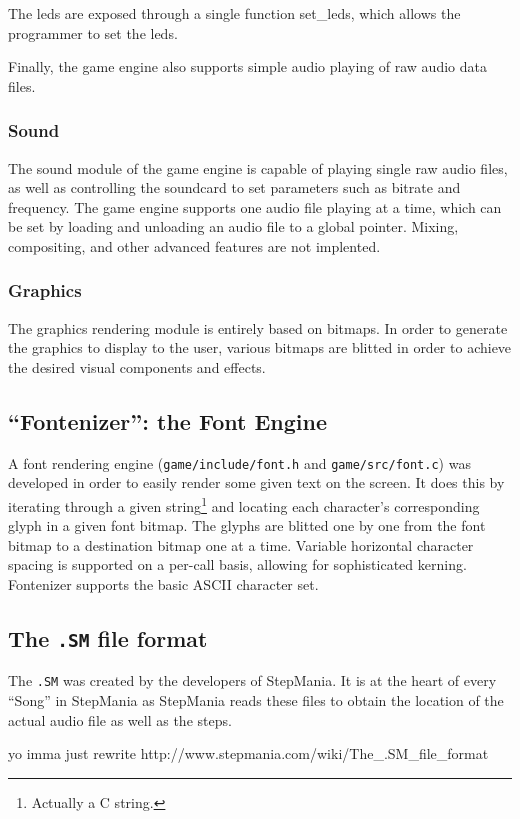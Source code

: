     The leds are exposed through a single function set_leds, which allows the programmer to set the leds.


    Finally, the game engine also supports simple audio playing of raw audio data files.


\subsubsection{Sound}
The sound module of the game engine is capable of playing single raw audio files, as well as controlling the soundcard to set parameters such as bitrate and frequency.
The game engine supports one audio file playing at a time, which can be set by loading and unloading an audio file to a global pointer.
Mixing, compositing, and other advanced features are not implented.

\subsubsection{Graphics}
The graphics rendering module is entirely based on bitmaps.
In order to generate the graphics to display to the user, various bitmaps are blitted in order to achieve the desired visual components and effects.


\subsection{``Fontenizer'': the Font Engine}
	A font rendering engine (\texttt{game/include/font.h} and \texttt{game/src/font.c}) was developed in order to easily render some given text on the screen.
	It does this by iterating through a given string\footnote{Actually a C string.} and locating each character's corresponding glyph in a given font bitmap.
	The glyphs are blitted one by one from the font bitmap to a destination bitmap one at a time.
    Variable horizontal character spacing is supported on a per-call basis, allowing for sophisticated kerning.
    Fontenizer supports the basic ASCII character set.
        
\subsection{The \texttt{.SM} file format}
The \texttt{.SM} was created by the developers of StepMania. It is at the heart of every ``Song'' in StepMania as StepMania reads these files to obtain the location of the actual audio file as well as the steps.

yo imma just rewrite http://www.stepmania.com/wiki/The_.SM_file_format
